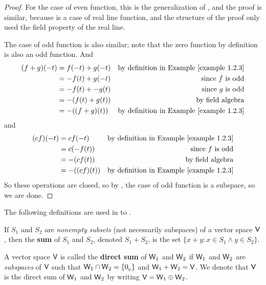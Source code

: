 \begin{proof}
For the case of even function, this is the generalization of , and the proof is similar,
because  is a case of real line function, and the structure of the proof only used the field property of the real line.

The case of odd function is also similar;
note that the zero function by definition is also an odd function.
And
\begin{align*}
    (f + g)(-t) & = f(-t) + g(-t) & \text{by definition in \EXAMPLE{1.2.3}} \\
                & = -f(t) + g(-t) & \text{since \(f\) is odd} \\
                & = -f(t) + -g(t) & \text{since \(g\) is odd} \\
                & = -(f(t) + g(t)) & \text{by field algebra} \\
                & = -((f + g)(t)) & \text{by definition in \EXAMPLE{1.2.3}}
\end{align*}
and
\begin{align*}
    (cf)(-t) & = cf(-t) & \text{by definition in \EXAMPLE{1.2.3}} \\
                & = c(-f(t)) & \text{since \(f\) is odd} \\
                & = -(cf(t)) & \text{by field algebra} \\
                & = -((cf)(t)) & \text{by definition in \EXAMPLE{1.2.3}}
\end{align*}
So these operations are closed, so by , the case of odd function is a subspace, so we are done.
\end{proof}

The following definitions are used in  to .

\begin{additional definition} \label{adef 1.8}
If \(S_1\) and \(S_2\) are \emph{nonempty} \emph{subsets} (not necessarily subspaces) of a vector space \(\textsf{V}\), then the \textbf{sum} of \(S_1\) and \(S_2\), denoted \(S_1 + S_2\), is the set \( \{ x + y : x \in S_1 \land y \in S_2 \} \).
\end{additional definition}

\begin{additional definition} \label{adef 1.9}
A vector space \(\textsf{V}\) is called the \textbf{direct sum} of \(\textsf{W}_1\) and \(\textsf{W}_2\) if \(\textsf{W}_1\) and \(\textsf{W}_2\) are \emph{subspaces} of \(\textsf{V}\) such that \(\textsf{W}_1 \cap \textsf{W}_2 = \{0_{_{\textsf{V}}}\}\) and \(\textsf{W}_1 + \textsf{W}_2 = \textsf{V}\).
We denote that \(\textsf{V}\) is the direct sum of \(\textsf{W}_1\) and \(\textsf{W}_2\) by writing \(\textsf{V} = \textsf{W}_1 \oplus \textsf{W}_2\).
\end{additional definition}

